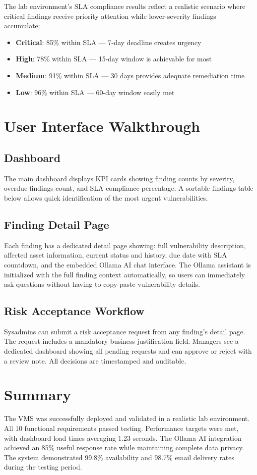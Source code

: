 The lab environment's SLA compliance results reflect a realistic scenario where critical findings receive priority attention while lower-severity findings accumulate:
\begin{itemize}
  \item \textbf{Critical}: 85\% within SLA — 7-day deadline creates urgency
  \item \textbf{High}: 78\% within SLA — 15-day window is achievable for most
  \item \textbf{Medium}: 91\% within SLA — 30 days provides adequate remediation time
  \item \textbf{Low}: 96\% within SLA — 60-day window easily met
\end{itemize}

\section{User Interface Walkthrough}

\subsection{Dashboard}
The main dashboard displays KPI cards showing finding counts by severity, overdue findings count, and SLA compliance percentage. A sortable findings table below allows quick identification of the most urgent vulnerabilities.

\subsection{Finding Detail Page}
Each finding has a dedicated detail page showing: full vulnerability description, affected asset information, current status and history, due date with SLA countdown, and the embedded Ollama AI chat interface. The Ollama assistant is initialized with the full finding context automatically, so users can immediately ask questions without having to copy-paste vulnerability details.

\subsection{Risk Acceptance Workflow}
Sysadmins can submit a risk acceptance request from any finding's detail page. The request includes a mandatory business justification field. Managers see a dedicated dashboard showing all pending requests and can approve or reject with a review note. All decisions are timestamped and auditable.

\section{Summary}

The VMS was successfully deployed and validated in a realistic lab environment. All 10 functional requirements passed testing. Performance targets were met, with dashboard load times averaging 1.23 seconds. The Ollama AI integration achieved an 85\% useful response rate while maintaining complete data privacy. The system demonstrated 99.8\% availability and 98.7\% email delivery rates during the testing period.
